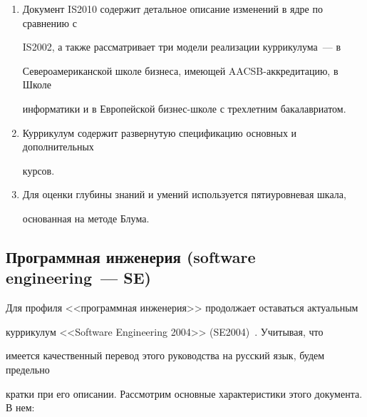 \begin{enumerate}[1.]
\item  Документ IS2010 содержит детальное описание изменений в ядре по сравнению с 

IS2002, а также рассматривает три модели реализации куррикулума~--- в 

Североамериканской школе бизнеса, имеющей AACSB-аккредитацию, в Школе 

информатики и в Европейской бизнес-школе с трехлетним бакалавриатом. 

\item Куррикулум содержит развернутую спецификацию основных и дополнительных 

курсов. 

\item Для оценки глубины знаний и умений используется пятиуровневая шкала, 

основанная на методе Блума.

\end{enumerate}







\subsection{Программная инженерия (software engineering~--- SE)}



      Для профиля <<программная инженерия>> продолжает оставаться актуальным 

куррикулум <<Software Engineering 2004>> (SE2004)~\cite{14-s, 11-s}. Учитывая, что 

имеется качественный перевод этого руководства на русский язык, будем предельно 

кратки при его описании. Рассмотрим основные характеристики этого документа. В нем:

